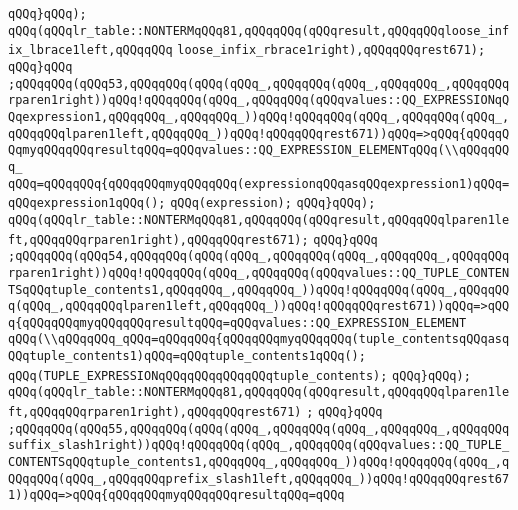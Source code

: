 \verb|qQQq}qQQq);|\newline
\verb|qQQq(qQQqlr_table::NONTERMqQQq81,qQQqqQQq(qQQqresult,qQQqqQQqloose_infix_lbrace1left,qQQqqQQq|\newline
\verb|loose_infix_rbrace1right),qQQqqQQqrest671);|\newline
\verb|qQQq}qQQq|\newline
\verb|;qQQqqQQq(qQQq53,qQQqqQQq(qQQq(qQQq_,qQQqqQQq(qQQq_,qQQqqQQq_,qQQqqQQqrparen1right))qQQq!qQQqqQQq(qQQq_,qQQqqQQq(qQQqvalues::QQ_EXPRESSIONqQQqexpression1,qQQqqQQq_,qQQqqQQq_))qQQq!qQQqqQQq(qQQq_,qQQqqQQq(qQQq_,qQQqqQQqlparen1left,qQQqqQQq_))qQQq!qQQqqQQqrest671))qQQq=>qQQq{qQQqqQQqmyqQQqqQQqresultqQQq=qQQqvalues::QQ_EXPRESSION_ELEMENTqQQq(\\qQQqqQQq_|\newline
\verb|qQQq=qQQqqQQq{qQQqqQQqmyqQQqqQQq(expressionqQQqasqQQqexpression1)qQQq=qQQqexpression1qQQq();|\newline
\verb|qQQq(expression);|\newline
\verb|qQQq}qQQq);|\newline
\verb|qQQq(qQQqlr_table::NONTERMqQQq81,qQQqqQQq(qQQqresult,qQQqqQQqlparen1left,qQQqqQQqrparen1right),qQQqqQQqrest671);|\newline
\verb|qQQq}qQQq|\newline
\verb|;qQQqqQQq(qQQq54,qQQqqQQq(qQQq(qQQq_,qQQqqQQq(qQQq_,qQQqqQQq_,qQQqqQQqrparen1right))qQQq!qQQqqQQq(qQQq_,qQQqqQQq(qQQqvalues::QQ_TUPLE_CONTENTSqQQqtuple_contents1,qQQqqQQq_,qQQqqQQq_))qQQq!qQQqqQQq(qQQq_,qQQqqQQq(qQQq_,qQQqqQQqlparen1left,qQQqqQQq_))qQQq!qQQqqQQqrest671))qQQq=>qQQq{qQQqqQQqmyqQQqqQQqresultqQQq=qQQqvalues::QQ_EXPRESSION_ELEMENT|\newline
\verb|qQQq(\\qQQqqQQq_qQQq=qQQqqQQq{qQQqqQQqmyqQQqqQQq(tuple_contentsqQQqasqQQqtuple_contents1)qQQq=qQQqtuple_contents1qQQq();|\newline
\verb|qQQq(TUPLE_EXPRESSIONqQQqqQQqqQQqqQQqtuple_contents);|\newline
\verb|qQQq}qQQq);|\newline
\verb|qQQq(qQQqlr_table::NONTERMqQQq81,qQQqqQQq(qQQqresult,qQQqqQQqlparen1left,qQQqqQQqrparen1right),qQQqqQQqrest671)|\newline
\verb|;|\newline
\verb|qQQq}qQQq|\newline
\verb|;qQQqqQQq(qQQq55,qQQqqQQq(qQQq(qQQq_,qQQqqQQq(qQQq_,qQQqqQQq_,qQQqqQQqsuffix_slash1right))qQQq!qQQqqQQq(qQQq_,qQQqqQQq(qQQqvalues::QQ_TUPLE_CONTENTSqQQqtuple_contents1,qQQqqQQq_,qQQqqQQq_))qQQq!qQQqqQQq(qQQq_,qQQqqQQq(qQQq_,qQQqqQQqprefix_slash1left,qQQqqQQq_))qQQq!qQQqqQQqrest671))qQQq=>qQQq{qQQqqQQqmyqQQqqQQqresultqQQq=qQQq|\newline
